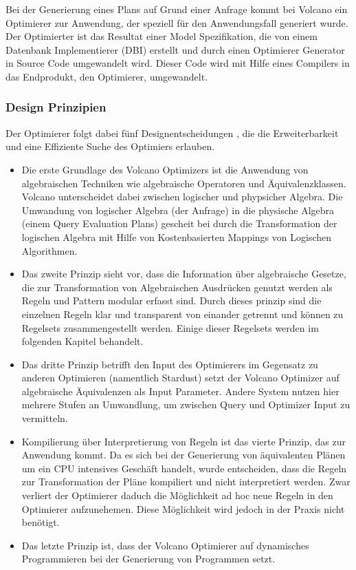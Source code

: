 Bei der Generierung eines Plans auf Grund einer Anfrage kommt bei Volcano ein Optimierer zur Anwendung, der speziell für den Anwendungsfall generiert wurde. Der Optimierter ist das Resultat einer Model Spezifikation, die von einem Datenbank Implementierer (DBI) erstellt und durch einen Optimierer Generator in Source Code umgewandelt wird. Dieser Code wird mit Hilfe eines Compilers in das Endprodukt, den Optimierer, umgewandelt.

 \subsubsection{Design Prinzipien}

Der Optimierer folgt dabei fünf Designentscheidungen \cite{graefe1993volcano}, die die Erweiterbarkeit und eine Effiziente Suche des Optimiers erlauben.

\begin{itemize}

\item Die erste Grundlage des Volcano Optimizers ist die Anwendung von algebraischen Techniken wie algebraische Operatoren und Äquivalenzklassen. Volcano unterscheidet dabei zwischen logischer und phypsicher Algebra. Die Umwandung von logischer Algebra (der Anfrage) in die physische Algebra (einem Query Evaluation Plans) gescheit bei durch die Transformation der logischen Algebra mit Hilfe von Kostenbasierten Mappings von Logischen Algorithmen.


\item Das zweite Prinzip sieht vor, dass die Information über algebraische Gesetze, die zur Transformation von Algebraischen Ausdrücken genutzt werden als Regeln und Pattern modular erfasst sind. Durch dieses prinzip sind die einzelnen Regeln klar und transparent von einander getrennt und können zu Regelsets zusammengestellt werden. Einige dieser Regelsets werden im folgenden Kapitel behandelt.


\item Das dritte Prinzip betrifft den Input des Optimierers im Gegensatz zu anderen Optimieren (namentlich Stardust) setzt der Volcano Optimizer auf algebraische Äquivalenzen als Input Parameter. Andere System nutzen hier mehrere Stufen an Umwandlung, um zwischen Query und Optimizer Input zu vermitteln. 

\item Kompilierung über Interpretierung von Regeln ist das vierte Prinzip, das zur Anwendung kommt. Da es sich bei der Generierung von äquivalenten Plänen um ein CPU intensives Geschäft handelt, wurde entscheiden, dass die Regeln zur Transformation der Pläne kompiliert und nicht interpretiert werden. Zwar verliert der Optimierer daduch die Möglichkeit ad hoc neue Regeln in den Optimierer aufzunehemen. Diese Möglichkeit wird jedoch in der Praxis nicht benötigt.

\item Das letzte Prinzip ist, dass der Volcano Optimierer auf dynamisches Programmieren bei der Generierung von Programmen setzt. 


\end{itemize}





